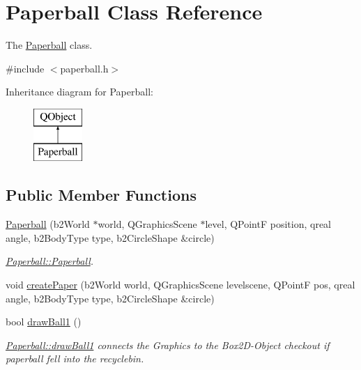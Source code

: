 \hypertarget{class_paperball}{}\section{Paperball Class Reference}
\label{class_paperball}


The \hyperlink{class_paperball}{Paperball} class.  




{\ttfamily \#include $<$paperball.\+h$>$}

Inheritance diagram for Paperball\+:\begin{figure}[H]
\begin{center}
\leavevmode
\includegraphics[height=2.000000cm]{class_paperball}
\end{center}
\end{figure}
\subsection*{Public Member Functions}
\begin{DoxyCompactItemize}
\item 
\hyperlink{class_paperball_ad0d9d4562bd894e529fdfa7a3ecb8e96}{Paperball} (b2\+World $\ast$world, Q\+Graphics\+Scene $\ast$level, Q\+PointF position, qreal angle, b2\+Body\+Type type, b2\+Circle\+Shape \&circle)
\begin{DoxyCompactList}\small\item\em \hyperlink{class_paperball_ad0d9d4562bd894e529fdfa7a3ecb8e96}{Paperball\+::\+Paperball}. \end{DoxyCompactList}\item 
void \hyperlink{class_paperball_a1d3b557c34068db1c78816c9147fe680}{create\+Paper} (b2\+World world, Q\+Graphics\+Scene levelscene, Q\+PointF pos, qreal angle, b2\+Body\+Type type, b2\+Circle\+Shape \&circle)
\item 
bool \hyperlink{class_paperball_a3bb15d3327d35c3408fe7e5b06bce078}{draw\+Ball1} ()
\begin{DoxyCompactList}\small\item\em \hyperlink{class_paperball_a3bb15d3327d35c3408fe7e5b06bce078}{Paperball\+::draw\+Ball1} connects the Graphics to the Box2\+D-\/\+Object checkout if paperball fell into the recyclebin. \end{DoxyCompactList}\end{DoxyCompactItemize}
